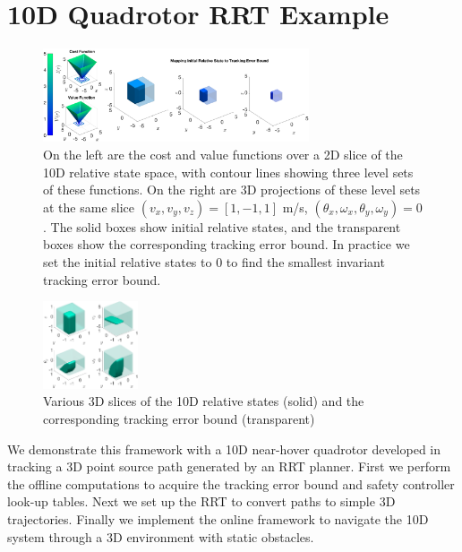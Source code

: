 \section{10D Quadrotor RRT Example \label{sec:results}}
\begin{figure}
	\centering
	\includegraphics[width=0.7\textwidth]{fig/quad10D_example_cost}
	\caption{On the left are the cost and value functions over a 2D slice of the 10D relative state space, with contour lines showing three level sets of these functions. On the right are 3D projections of these level sets at the same slice $(v_{x},v_{y},v_{z})=[1, -1, 1]$ m/s, $(\theta_{x},\omega_{x},\theta_{y},\omega_{y})=0$. The solid boxes show initial relative states, and the transparent boxes show the corresponding tracking error bound. In practice we set the initial relative states to 0 to find the smallest invariant tracking error bound.}
	\label{fig:quad10D_example}
		\vspace{-.2in}
	\end{figure} 
\begin{figure}
	\centering
	\includegraphics[width=0.25\textwidth]{fig/quad10D_slices}
	\caption{Various 3D slices of the 10D relative states (solid) and the corresponding tracking error bound (transparent)}
	\label{fig:quad10D_example_slices}
		\vspace{-.21in}
\end{figure} 
We demonstrate this framework with a 10D near-hover quadrotor developed in \cite{Bouffard12} tracking a 3D point source path generated by an RRT planner. First we perform the offline computations to acquire the tracking error bound and safety controller look-up tables. Next we set up the RRT to convert paths to simple 3D trajectories. Finally we implement the online framework to navigate the 10D system through a 3D environment with static obstacles.

